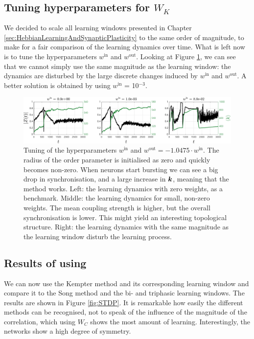 \subsection{Tuning hyperparameters for \texorpdfstring{$W_K$}{TEXT}}
We decided to scale all learning windows presented in Chapter \ref{sec:HebbianLearningAndSynapticPlasticity} to the same order of magnitude, to make for a fair comparison of the learning dynamics over time. What is left now is to tune the hyperparameters $w^{\mathrm{in}}$ and $w^{\mathrm{out}}$. Looking at Figure \ref{fig:KempterWinWout}, we can see that we cannot simply use the same magnitude as the learning window: the dynamics are disturbed by the large discrete changes induced by $w^{\mathrm{in}}$ and $w^{\mathrm{out}}$. A better solution is obtained by using $w^{\mathrm{in}}$ = 10$^{-3}$.

\begin{figure}[H]
\centering
\includegraphics[width = \textwidth]{../Figures/Learning/KempterWinWout.pdf}
\caption{Tuning of the hyperparameters $w^{\mathrm{in}}$ and $w^{\mathrm{out}} = -1.0475 \cdot w^{\mathrm{in}}$. The radius of the order parameter is initialised as zero and quickly becomes non-zero. When neurons start bursting we can see a big drop in synchronisation, and a large increase in ${\boldsymbol{k}}$, meaning that the \STDP method works. Left: the learning dynamics with zero weights, as a benchmark. Middle: the learning dynamics for small, non-zero weights. The mean coupling strength is higher, but the overall synchronisation is lower. This might yield an interesting topological structure. Right: the learning dynamics with the same magnitude as the learning window disturb the learning process.}
\label{fig:KempterWinWout}
\end{figure}


\subsection{Results of using \STDP} %
We can now use the Kempter method and its corresponding learning window and compare it to the Song method and the bi- and triphasic learning windows. The results are shown in Figure \ref{fig:STDP}. It is remarkable how easily the different methods can be recognised, not to speak of the influence of the magnitude of the correlation, which using $W_C$ shows the most amount of learning. Interestingly, the networks show a high degree of symmetry. \\

